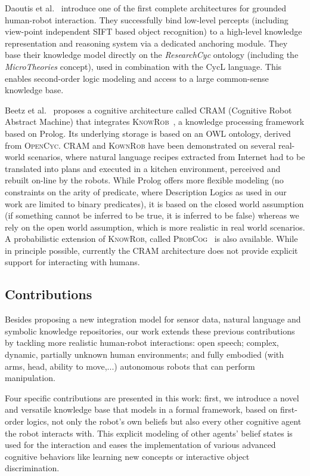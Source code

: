 \documentclass[twocolumn]{svjour3}
\begin{document}
Daoutis et al.~\cite{Daoutis2009} introduce one of the first complete
architectures for grounded human-robot interaction. They successfully bind
low-level percepts (including view-point independent SIFT based object
recognition) to a high-level knowledge representation and reasoning system via
a dedicated anchoring module. They base their knowledge model directly on the
\textit{ResearchCyc} ontology (including the \textit{MicroTheories} concept),
used in combination with the {\sc CycL} language. This enables second-order
logic modeling and access to a large common-sense knowledge base.

Beetz et al.~\cite{Beetz2010} proposes a cognitive architecture called
\textsc{CRAM} (Cognitive Robot Abstract Machine) that integrates
\textsc{KnowRob}~\cite{Tenorth2009a}, a knowledge processing framework based on
Prolog. Its underlying storage is based on an OWL ontology, derived from
\textsc{OpenCyc}. \textsc{CRAM} and \textsc{KownRob} have been demonstrated on
several real-world scenarios, where natural language recipes extracted from
Internet had to be translated into plans and executed in a kitchen environment,
perceived and rebuilt on-line by the robots. While Prolog offers more flexible
modeling (no constraints on the arity of predicate, where Description Logics as
used in our work are limited to binary predicates), it is based on the closed
world assumption (if something cannot be inferred to be true, it is inferred to
be false) whereas we rely on the open world assumption, which is more realistic
in real world scenarios. A probabilistic extension of \textsc{KnowRob}, called
\textsc{ProbCog}~\cite{Jain2009} is also available. While in principle
possible, currently the CRAM architecture does not provide explicit support for
interacting with humans.


\subsection{Contributions}

Besides proposing a new integration model for sensor data, natural language and
symbolic knowledge repositories, our work extends these previous contributions
by tackling more realistic human-robot interactions: open speech; complex,
dynamic, partially unknown human environments; and fully embodied (with arms,
head, ability to move,...) autonomous robots that can perform manipulation.

Four specific contributions are presented in this work: first, we introduce a
novel and versatile knowledge base that models in a formal framework, based on
first-order logics, not only the robot's own beliefs but also every other
cognitive agent the robot interacts with.  This explicit modeling of other
agents' belief states is used for the interaction and eases the implementation
of various advanced cognitive behaviors like learning new concepts or
interactive object discrimination.
\end{document}
